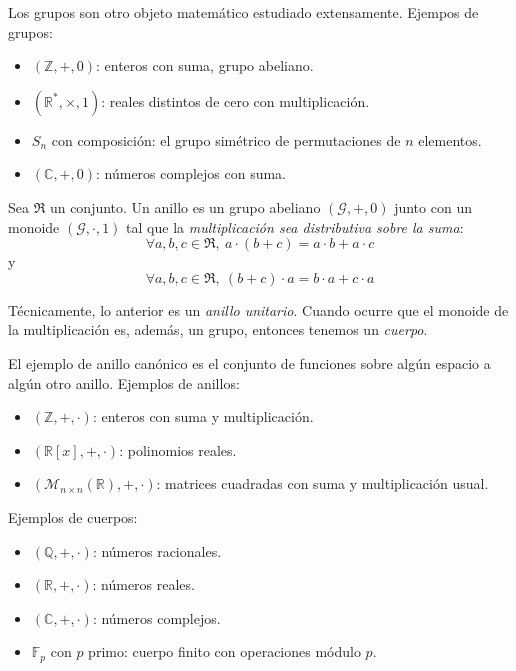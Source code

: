 \documentclass[10pt]{article}
\newcommand{\Z}{\mathbb{Z}}
\newcommand{\Q}{\mathbb{Q}}
\newcommand{\R}{\mathbb{R}}
\newcommand{\C}{\mathbb{C}}
\begin{document}
\begin{example}[Grupos]
  Los grupos son otro objeto matemático estudiado extensamente. Ejempos de grupos:
  \begin{itemize}
    \item $(\Z, +, 0)$: enteros con suma, grupo abeliano.
    \item $(\R^*, \times, 1)$: reales distintos de cero con multiplicación.
    \item $S_n$ con composición: el grupo simétrico de permutaciones de $n$ elementos.
    \item $(\C, +, 0)$: números complejos con suma.
  \end{itemize}
\end{example}

\begin{definition}[Anillos]
  Sea $ \mathfrak{R} $ un conjunto. Un anillo es un grupo abeliano $ \left(\mathcal{G}, +, 0\right) $ junto con un monoide
  $ \left( \mathcal{G}, \cdot, 1 \right) $ tal que la \textit{multiplicación sea distributiva sobre la suma}:
  \[ \forall a, b, c \in \mathfrak{R}, \ a \cdot (b + c) = a \cdot b + a \cdot c \]
  y
  \[ \forall a, b, c \in \mathfrak{R}, \ (b + c) \cdot a = b \cdot a + c \cdot a \]

  Técnicamente, lo anterior es un \textit{anillo unitario}. Cuando ocurre que el monoide de la multiplicación es, además,
  un grupo, entonces tenemos un \textit{cuerpo}.
\end{definition}

\begin{example}[Anillos]
 El ejemplo de anillo canónico es el conjunto de funciones sobre algún espacio a algún otro anillo. Ejemplos de anillos:
  \begin{itemize}
    \item $(\Z, +, \cdot)$: enteros con suma y multiplicación.
    \item $(\R[x], +, \cdot)$: polinomios reales.
    \item $(\mathcal{M}_{n \times n}(\R), +, \cdot)$: matrices cuadradas con suma y multiplicación usual.
  \end{itemize}
\end{example}

\begin{example}[Cuerpos]
  Ejemplos de cuerpos:
  \begin{itemize}
    \item $(\Q, +, \cdot)$: números racionales.
    \item $(\R, +, \cdot)$: números reales.
    \item $(\C, +, \cdot)$: números complejos.
    \item $\mathbb{F}_p$ con $p$ primo: cuerpo finito con operaciones módulo $p$.
  \end{itemize}
\end{example}
\end{document}
